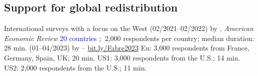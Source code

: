 \documentclass[aspectratio=169,xcolor=dvipsnames, 11pt,mathserif]{beamer}
\begin{document}


\subsection{Support for global redistribution}

\begin{frame}{International surveys with a focus on the West\label{questionnaires}}
    \bbvs
    \ip {}  (02/2021--02/2022) by , \textit{American Economic Review}
    \bbvs \ip \textcolor{blue}{20 countries}%
    ; $~$2,000 respondents per country; median duration: 28 min. \ee
    \ip {} (01--04/2023) by  -- \href{https://bit.ly/Fabre2023}{bit.ly/Fabre2023}
    \bbvs \ip Eu: 3,000 respondents from France, Germany, Spain, UK; 20 min. 
    \ip US1: 3,000 respondents from the U.S.; 14 min. 
    \ip US2: 2,000 respondents from the U.S.; 11 min.
    \ee 
    \ee \vspace*{-.2cm}
\end{frame}
\end{document}
